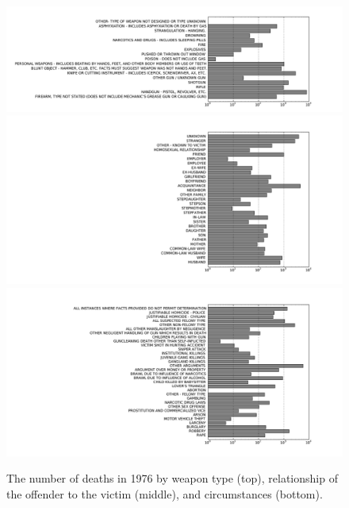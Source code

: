 \begin{figure}[H]
  \centering
    \includegraphics[width=\linewidth]{images/weaps.pdf}
    \includegraphics[width=\linewidth]{images/relationship.pdf}
    \includegraphics[width=\linewidth]{images/circumstance.pdf}
  \caption{The number of deaths in 1976 by weapon type (top), relationship of the offender to the victim (middle), and circumstances (bottom).}
\end{figure}

